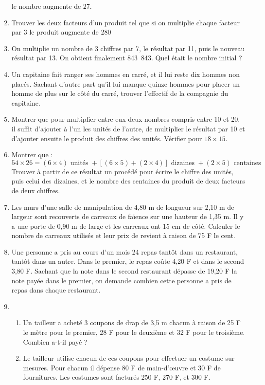 \begin{enumerate}
le nombre augmente de 27. 
\item Trouver les deux facteurs d'un produit tel que si on multiplie chaque facteur par 3 le produit augmente de 280
\item On multiplie un nombre de 3 chiffres par 7, le résultat par 11, puis le nouveau résultat par 13. On obtient finalement 843~843. Quel était le nombre initial ? 
\item Un capitaine fait ranger ses hommes en carré, et il lui reste dix hommes non placés. Sachant d'autre part qu'il lui manque quinze hommes pour placer un homme de plus sur le côté du carré, trouver l'effectif de la compagnie du capitaine. 
\item Montrer que pour multiplier entre eux deux nombres compris entre 10 et 20, il suffit d'ajouter à l'un les unités de l'autre, de multiplier le résultat par 10 et d'ajouter ensuite le produit des chiffres des unités. Vérifier pour $18 \times 15$. 
\item Montrer que : 
\[ 54 \times 26 = (6 \times 4) \text{ unités } + 
[(6 \times 5) + (2 \times 4) ]\text{ dizaines } + 
(2 \times 5) \text{ centaines } \]
Trouver à partir de ce résultat un procédé pour écrire le chiffre des unités, puis celui des dizaines, et le nombre des centaines du produit de deux facteurs de deux chiffres. 
\item Les murs d'une salle de manipulation de 
4,80 m de longueur sur 2,10 m de largeur sont recouverts de carreaux de faïence sur une hauteur de 1,35 m. Il y a une porte de 0,90 m de large et les carreaux ont 15 cm de côté. Calculer le nombre de carreaux utilisés et leur prix de revient à raison 
de 75 F le cent. 
\item Une personne a pris au cours d'un mois 24 repas
tantôt dans un restaurant, tantôt dans un autre. Dans 
le premier, le repas coûte 4,20 F et dans le second
3,80 F. Sachant que la note dans le second restaurant
dépasse de 19,20 F la note payée dans le premier, on demande combien cette personne a pris de repas dans chaque restaurant. 
\item \begin{enumerate}
\item Un tailleur a acheté 3 coupons de drap de 3,5 m
chacun à raison de 25 F le mètre pour le premier, 28 F
pour le deuxième et 32 F pour le troisième. Combien
a-t-il payé ? 
\item Le tailleur utilise chacun de ces coupons pour 
effectuer un costume sur mesures. Pour chacun il 
dépense 80 F de main-d'œuvre et 30 F de fournitures.
Les costumes sont facturés 250 F, 270 F, et 300 F. 

\end{enumerate}
\end{enumerate}
